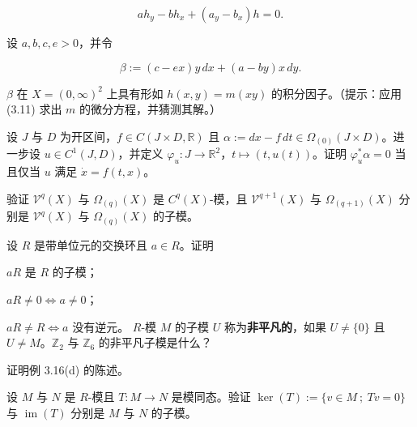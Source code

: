 \begin{exercises}
\begin{items}
\begin{equation}
a h_{y} - b h_{x} + (a_{y} - b_{x})h = 0 .\tag{3.11}
\end{equation}
\item

设 $ a, b, c, e > 0 $，并令

\[
\beta := (c - ex)y\,dx + (a - by)x\,dy .
\]

\proofhead
$ \beta $ 在 $ X = (0,\infty)^{2} $ 上具有形如 $ h(x, y) = m(xy) $ 的积分因子。（提示：应用 (3.11) 求出 $ m $ 的微分方程，并猜测其解。）
\end{items}

\item

设 $ J $ 与 $ D $ 为开区间，$ f \in C(J\times D, \mathbb{R}) $ 且 $ \alpha := dx - f\,dt \in \Omega_{(0)}(J\times D) $。进一步设 $ u \in C^{1}(J, D) $，并定义 $ \varphi_{u} : J \to \mathbb{R}^{2} $，$ t \mapsto (t, u(t)) $。证明 $ \varphi^{*}_{u}\alpha = 0 $ 当且仅当 $ u $ 满足 $ \dot x = f(t, x) $。

\item

验证 $ \mathcal{V}^{q}(X) $ 与 $ \Omega_{(q)}(X) $ 是 $ C^{q}(X) $-模，且 $ \mathcal{V}^{q+1}(X) $ 与 $ \Omega_{(q+1)}(X) $ 分别是 $ \mathcal{V}^{q}(X) $ 与 $ \Omega_{(q)}(X) $ 的子模。

\item

设 $ R $ 是带单位元的交换环且 $ a \in R $。证明

\begin{items}
\item

$ aR $ 是 $ R $ 的子模；

\item

$ aR \ne 0 \iff a \ne 0 $；

\item

$ aR \ne R \iff a $ 没有逆元。
$ R $-模 $ M $ 的子模 $ U $ 称为\textbf{非平凡的}，如果 $ U \ne \{0\} $ 且 $ U \ne M $。$ \mathbb{Z}_{2} $ 与 $ \mathbb{Z}_{6} $ 的非平凡子模是什么？

\end{items}

\item

证明例 3.16(d) 的陈述。

\item

设 $ M $ 与 $ N $ 是 $ R $-模且 $ T : M \to N $ 是模同态。验证 $ \ker(T) := \{v \in M \ ; \ Tv = 0\} $ 与 $ \operatorname{im}(T) $ 分别是 $ M $ 与 $ N $ 的子模。

\end{exercises}

